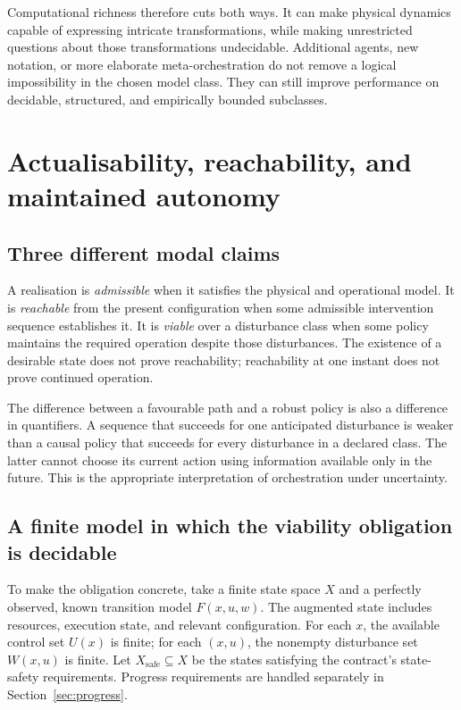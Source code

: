 \documentclass[11pt,a4paper]{article}
\theoremstyle{definition}
\theoremstyle{remark}
\begin{document}
Computational richness therefore cuts both ways. It can make physical dynamics capable of expressing intricate transformations, while making unrestricted questions about those transformations undecidable. Additional agents, new notation, or more elaborate meta-orchestration do not remove a logical impossibility in the chosen model class. They can still improve performance on decidable, structured, and empirically bounded subclasses.

\section{Actualisability, reachability, and maintained autonomy}\label{sec:viability}
\subsection{Three different modal claims}
A realisation is \emph{admissible} when it satisfies the physical and operational model. It is \emph{reachable} from the present configuration when some admissible intervention sequence establishes it. It is \emph{viable} over a disturbance class when some policy maintains the required operation despite those disturbances. The existence of a desirable state does not prove reachability; reachability at one instant does not prove continued operation.

The difference between a favourable path and a robust policy is also a difference in quantifiers. A sequence that succeeds for one anticipated disturbance is weaker than a causal policy that succeeds for every disturbance in a declared class. The latter cannot choose its current action using information available only in the future. This is the appropriate interpretation of orchestration under uncertainty.

\subsection{A finite model in which the viability obligation is decidable}
To make the obligation concrete, take a finite state space $X$ and a perfectly observed, known transition model $F(x,u,w)$. The augmented state includes resources, execution state, and relevant configuration. For each $x$, the available control set $U(x)$ is finite; for each $(x,u)$, the nonempty disturbance set $W(x,u)$ is finite. Let $X_{\mathrm{safe}}\subseteq X$ be the states satisfying the contract's state-safety requirements. Progress requirements are handled separately in Section~\ref{sec:progress}.
\end{document}
